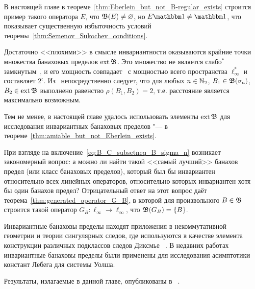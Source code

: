 В настоящей главе в теореме~\ref{thm:Eberlein_but_not_B-regular_exists}
строится пример такого оператора $E$, что $\mathfrak{B}(E)\ne\varnothing$,
но $E\one \ne \one$, что показывает существенную избыточность условий теоремы~\ref{thm:Semenov_Sukochev_conditions}.


Достаточно <<плохими>> в смысле инвариантности оказываются крайние точки множества банаховых пределов $\operatorname{ext} \mathfrak{B}$.
Это множество не является слабо$^*$ замкнутым~\cite{Nillsen,Talagrand},
и его мощность совпадает~\cite{Chou} с мощностью всего пространства $\ell_\infty^*$
и составляет $2^{\mathfrak c}$.
Из~\cite[следствие 6]{semenov2020dilation} непосредственно следует, что для любых
$n\in\mathbb{N}_2$, $B_1 \in \mathfrak{B}(\sigma_n)$, $B_2 \in \operatorname{ext}\mathfrak{B}$ выполнено равенство
$\rho(B_1,B_2) = 2$, т.е. расстояние является максимально возможным.



Тем не менее, в настоящей главе удалось использовать элементы $\operatorname{ext}\mathfrak{B}$ для исследования инвариантных банаховых пределов
"--- в теореме~\ref{thm:amiable_but_not_Eberlein_exists}.

При взгляде на включение~\eqref{eq:B_C_subsetneq_B_sigma_n} возникает закономерный вопрос:
а можно ли найти такой <<самый лучший>> банахов предел (или класс банаховых пределов),
который был бы инвариантен относительно всех линейных операторов,
относительно которых инвариантен хотя бы один банахов предел?
Отрицательный ответ на этот вопрос даёт теорема~\ref{thm:generated_operator_G_B}, в которой
для произвольного $B\in \mathfrak{B}$ строится такой оператор $G_B:\ell_\infty \to \ell_\infty$,
что $\mathfrak{B}(G_B) = \{B\}$.

Инвариантные банаховы пределы находят приложения в некоммутативной геометрии
и теории сингулярных следов, где используются в качестве элемента конструкции
различных подклассов следов Диксмье
~\cite{carey2003spectral,lord2012singular,sukochev2015characterization,sukochev2016dixmier}.
В недавних работах~\cite{astashkin2015constants_rus_DAN,astashkin2016constants_rus_SMJ} инвариантные банаховы пределы были применены для исследования
асимптотики констант Лебега для системы Уолша.


Результаты, излагаемые в данной главе, опубликованы в%
~\cite{
avdeev2024set_DAN_rus,
avdeev2024decomposition,
our-vvmsh-2018,
our-ped-2018-inf-dim-ker,
vzms2025linear,
}.
